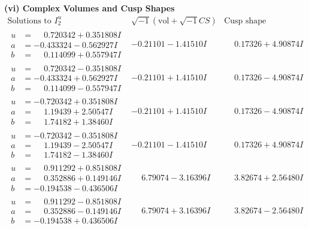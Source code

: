 \documentclass[1p]{elsarticle_modified}
\theoremstyle{definition}
\newcommand{\I}{\sqrt{-1}}
\begin{document}
\newpage\flushleft \textbf{(vi) Complex Volumes and Cusp Shapes}
$$\begin{array}{c|c|c}  
\text{Solutions to }I^u_{2}& \I (\text{vol} + \sqrt{-1}CS) & \text{Cusp shape}\\
 \hline 
\begin{aligned}
u &= \phantom{-}0.720342 + 0.351808 I \\
a &= -0.433324 - 0.562927 I \\
b &= \phantom{-}0.114099 + 0.557947 I\end{aligned}
 & -0.21101 - 1.41510 I & \phantom{-}0.17326 + 4.90874 I \\ \hline\begin{aligned}
u &= \phantom{-}0.720342 - 0.351808 I \\
a &= -0.433324 + 0.562927 I \\
b &= \phantom{-}0.114099 - 0.557947 I\end{aligned}
 & -0.21101 + 1.41510 I & \phantom{-}0.17326 - 4.90874 I \\ \hline\begin{aligned}
u &= -0.720342 + 0.351808 I \\
a &= \phantom{-}1.19439 + 2.50547 I \\
b &= \phantom{-}1.74182 + 1.38460 I\end{aligned}
 & -0.21101 + 1.41510 I & \phantom{-}0.17326 - 4.90874 I \\ \hline\begin{aligned}
u &= -0.720342 - 0.351808 I \\
a &= \phantom{-}1.19439 - 2.50547 I \\
b &= \phantom{-}1.74182 - 1.38460 I\end{aligned}
 & -0.21101 - 1.41510 I & \phantom{-}0.17326 + 4.90874 I \\ \hline\begin{aligned}
u &= \phantom{-}0.911292 + 0.851808 I \\
a &= \phantom{-}0.352886 + 0.149146 I \\
b &= -0.194538 - 0.436506 I\end{aligned}
 & \phantom{-}6.79074 - 3.16396 I & \phantom{-}3.82674 + 2.56480 I \\ \hline\begin{aligned}
u &= \phantom{-}0.911292 - 0.851808 I \\
a &= \phantom{-}0.352886 - 0.149146 I \\
b &= -0.194538 + 0.436506 I\end{aligned}
 & \phantom{-}6.79074 + 3.16396 I & \phantom{-}3.82674 - 2.56480 I \\ \hline\begin{aligned}

\end{aligned}
\end{array}$$
\end{document}
